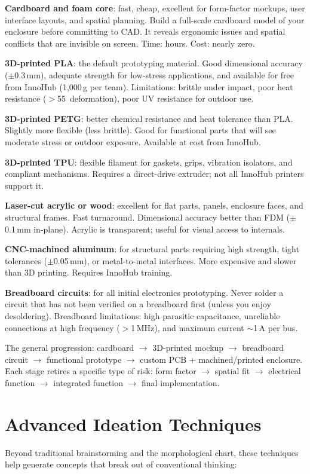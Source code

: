 \textbf{Cardboard and foam core}: fast, cheap, excellent for form-factor mockups, user interface layouts, and spatial planning. Build a full-scale cardboard model of your enclosure before committing to CAD. It reveals ergonomic issues and spatial conflicts that are invisible on screen. Time: hours. Cost: nearly zero.

\textbf{3D-printed PLA}: the default prototyping material. Good dimensional accuracy ($\pm$0.3\,mm), adequate strength for low-stress applications, and available for free from InnoHub (1,000\,g per team). Limitations: brittle under impact, poor heat resistance ($>$55\,\degC{} deformation), poor UV resistance for outdoor use.

\textbf{3D-printed PETG}: better chemical resistance and heat tolerance than PLA. Slightly more flexible (less brittle). Good for functional parts that will see moderate stress or outdoor exposure. Available at cost from InnoHub.

\textbf{3D-printed TPU}: flexible filament for gaskets, grips, vibration isolators, and compliant mechanisms. Requires a direct-drive extruder; not all InnoHub printers support it.

\textbf{Laser-cut acrylic or wood}: excellent for flat parts, panels, enclosure faces, and structural frames. Fast turnaround. Dimensional accuracy better than FDM ($\pm$0.1\,mm in-plane). Acrylic is transparent; useful for visual access to internals.

\textbf{CNC-machined aluminum}: for structural parts requiring high strength, tight tolerances ($\pm$0.05\,mm), or metal-to-metal interfaces. More expensive and slower than 3D printing. Requires InnoHub training.

\textbf{Breadboard circuits}: for all initial electronics prototyping. Never solder a circuit that has not been verified on a breadboard first (unless you enjoy desoldering). Breadboard limitations: high parasitic capacitance, unreliable connections at high frequency ($>$1\,MHz), and maximum current $\sim$1\,A per bus.

The general progression: cardboard $\to$ 3D-printed mockup $\to$ breadboard circuit $\to$ functional prototype $\to$ custom PCB + machined/printed enclosure. Each stage retires a specific type of risk: form factor $\to$ spatial fit $\to$ electrical function $\to$ integrated function $\to$ final implementation.


\section{Advanced Ideation Techniques}
Beyond traditional brainstorming and the morphological chart, these techniques help generate concepts that break out of conventional thinking:


